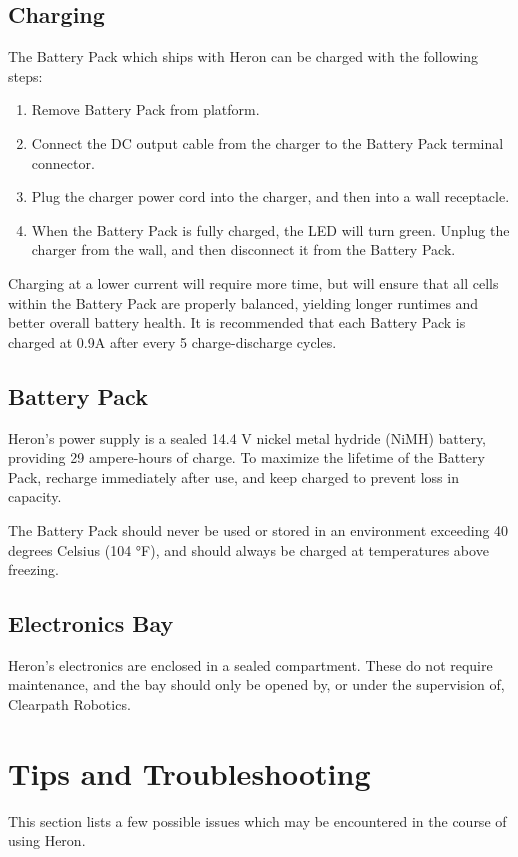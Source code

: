 \documentclass[]{clearpath-latex/clearpath-manual}
\begin{document}
\subsection{Charging}
The Battery Pack which ships with Heron can be charged with the following steps:

\begin{enumerate}[nolistsep]
	\item Remove Battery Pack from platform.
	\item Connect the DC output cable from the charger to the Battery Pack terminal connector.
	\item Plug the charger power cord into the charger, and then into a wall receptacle.
	\item When the Battery Pack is fully charged, the LED will turn green. Unplug the charger from the wall, and then disconnect it from the Battery Pack.
\end{enumerate}

Charging at a lower current will require more time, but will ensure that all cells within the Battery Pack are properly balanced, yielding longer runtimes and better overall battery health. It is recommended that each Battery Pack is charged at 0.9A after every 5 charge-discharge cycles.

\subsection{Battery Pack}
Heron's power supply is a sealed 14.4 V nickel metal hydride (NiMH) battery, providing 29 ampere-hours of charge. To maximize the lifetime of the Battery Pack, recharge immediately after use, and keep charged to prevent loss in capacity.

The Battery Pack should never be used or stored in an environment exceeding 40 degrees Celsius (104 °F), and should always be charged at temperatures above freezing.

\subsection{Electronics Bay}
Heron's electronics are enclosed in a sealed compartment. These do not require maintenance, and the bay should only be opened by, or under the supervision of, Clearpath Robotics.

\newpage

\section{Tips and Troubleshooting}
This section lists a few possible issues which may be encountered in the course of using Heron.
\end{document}
